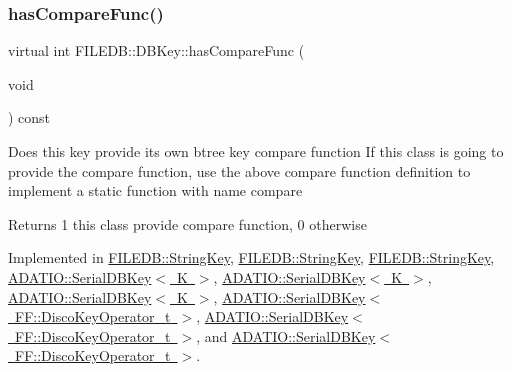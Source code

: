 \mbox{\label{classFILEDB_1_1DBKey_a416c32ba10caf76e6b7ff4986cfc3c05}} 
\subsubsection{\texorpdfstring{hasCompareFunc()}{hasCompareFunc()}\hspace{0.1cm}{\footnotesize\ttfamily [3/3]}}
{\footnotesize\ttfamily virtual int F\+I\+L\+E\+D\+B\+::\+D\+B\+Key\+::has\+Compare\+Func (\begin{DoxyParamCaption}\item[{void}]{ }\end{DoxyParamCaption}) const\hspace{0.3cm}{\ttfamily [pure virtual]}}

Does this key provide its own btree key compare function If this class is going to provide the compare function, use the above compare function definition to implement a static function with name compare

\begin{DoxyReturn}{Returns}
1 this class provide compare function, 0 otherwise 
\end{DoxyReturn}


Implemented in \mbox{\hyperlink{classFILEDB_1_1StringKey_a430c4d6d22db7160c501c1703f9f13cf}{F\+I\+L\+E\+D\+B\+::\+String\+Key}}, \mbox{\hyperlink{classFILEDB_1_1StringKey_a430c4d6d22db7160c501c1703f9f13cf}{F\+I\+L\+E\+D\+B\+::\+String\+Key}}, \mbox{\hyperlink{classFILEDB_1_1StringKey_a430c4d6d22db7160c501c1703f9f13cf}{F\+I\+L\+E\+D\+B\+::\+String\+Key}}, \mbox{\hyperlink{classADATIO_1_1SerialDBKey_a2f28d2ac39919d9cb9f6fc097944c49c}{A\+D\+A\+T\+I\+O\+::\+Serial\+D\+B\+Key$<$ K $>$}}, \mbox{\hyperlink{classADATIO_1_1SerialDBKey_a2f28d2ac39919d9cb9f6fc097944c49c}{A\+D\+A\+T\+I\+O\+::\+Serial\+D\+B\+Key$<$ K $>$}}, \mbox{\hyperlink{classADATIO_1_1SerialDBKey_a2f28d2ac39919d9cb9f6fc097944c49c}{A\+D\+A\+T\+I\+O\+::\+Serial\+D\+B\+Key$<$ K $>$}}, \mbox{\hyperlink{classADATIO_1_1SerialDBKey_a2f28d2ac39919d9cb9f6fc097944c49c}{A\+D\+A\+T\+I\+O\+::\+Serial\+D\+B\+Key$<$ F\+F\+::\+Disco\+Key\+Operator\+\_\+t $>$}}, \mbox{\hyperlink{classADATIO_1_1SerialDBKey_a2f28d2ac39919d9cb9f6fc097944c49c}{A\+D\+A\+T\+I\+O\+::\+Serial\+D\+B\+Key$<$ F\+F\+::\+Disco\+Key\+Operator\+\_\+t $>$}}, and \mbox{\hyperlink{classADATIO_1_1SerialDBKey_a2f28d2ac39919d9cb9f6fc097944c49c}{A\+D\+A\+T\+I\+O\+::\+Serial\+D\+B\+Key$<$ F\+F\+::\+Disco\+Key\+Operator\+\_\+t $>$}}.

